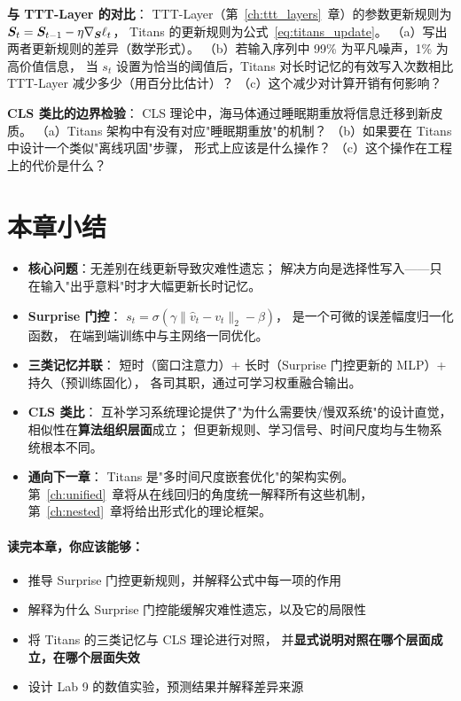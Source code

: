 \begin{exercise}
\textbf{与 TTT-Layer 的对比}：
TTT-Layer（第~\ref{ch:ttt_layers}~章）的参数更新规则为
$\boldsymbol{S}_t = \boldsymbol{S}_{t-1} - \eta \nabla_{\boldsymbol{S}} \ell_t$，
Titans 的更新规则为公式~\eqref{eq:titans_update}。
（a）写出两者更新规则的差异（数学形式）。
（b）若输入序列中 99\% 为平凡噪声，1\% 为高价值信息，
当 $s_t$ 设置为恰当的阈值后，Titans 对长时记忆的有效写入次数相比 TTT-Layer 减少多少（用百分比估计）？
（c）这个减少对计算开销有何影响？
\end{exercise}

\begin{exercise}
\textbf{CLS 类比的边界检验}：
CLS 理论中，海马体通过睡眠期重放将信息迁移到新皮质。
（a）Titans 架构中有没有对应"睡眠期重放"的机制？
（b）如果要在 Titans 中设计一个类似"离线巩固"步骤，
形式上应该是什么操作？
（c）这个操作在工程上的代价是什么？
\end{exercise}

\section{本章小结}
\label{sec:titans_summary}

\begin{itemize}
  \item \textbf{核心问题}：无差别在线更新导致灾难性遗忘；
    解决方向是选择性写入——只在输入"出乎意料"时才大幅更新长时记忆。

  \item \textbf{Surprise 门控}：
    $s_t = \sigma(\gamma \|\hat{v}_t - v_t\|_2 - \beta)$，
    是一个可微的误差幅度归一化函数，
    在端到端训练中与主网络一同优化。

  \item \textbf{三类记忆并联}：
    短时（窗口注意力）+ 长时（Surprise 门控更新的 MLP）+ 持久（预训练固化），
    各司其职，通过可学习权重融合输出。

  \item \textbf{CLS 类比}：
    互补学习系统理论提供了"为什么需要快/慢双系统"的设计直觉，
    相似性在\textbf{算法组织层面}成立；
    但更新规则、学习信号、时间尺度均与生物系统根本不同。

  \item \textbf{通向下一章}：
    Titans 是"多时间尺度嵌套优化"的架构实例。
    第~\ref{ch:unified}~章将从在线回归的角度统一解释所有这些机制，
    第~\ref{ch:nested}~章将给出形式化的理论框架。
\end{itemize}

\paragraph{读完本章，你应该能够：}
\begin{itemize}
  \item 推导 Surprise 门控更新规则，并解释公式中每一项的作用
  \item 解释为什么 Surprise 门控能缓解灾难性遗忘，以及它的局限性
  \item 将 Titans 的三类记忆与 CLS 理论进行对照，
    并\textbf{显式说明对照在哪个层面成立，在哪个层面失效}
  \item 设计 Lab 9 的数值实验，预测结果并解释差异来源
\end{itemize}
